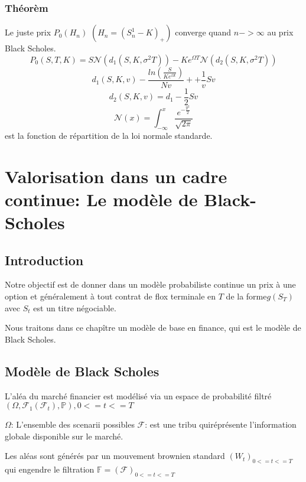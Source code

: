 \documentclass{article}
\begin{document}
\subsubsection{Th\'eor\`em}
Le juste prix $P_0(H_n)$ $(H_n=(S_n^1-K)_+)$ converge quand $n->\infty$ au prix Black Scholes.
\begin{equation}
P_0(S,T,K)=S\mathcal{N}(d_1(S,K,\sigma^2 T))-Ke^{\Omega T}\mathcal{N}(d_2(S,K,\sigma^2 T))
\end{equation}
\begin{equation}
d_1(S,K,v)-\frac{ln(\frac{S}{Ke^{\Omega t}})}{Nv}++\frac{1}{v}Sv
\end{equation}
\begin{equation}
d_2(S,K,v)=d_1-\frac{1}{2}Sv
\end{equation}
\begin{equation}
\mathcal{N}(x)=\int_{-\infty}^x\frac{e^{-\frac{y^2}{2}}}{\sqrt{2\pi}}
\end{equation}
est la fonction de r\'epartition de la loi normale standarde.

\section{Valorisation dans un cadre continue: Le mod\`ele de Black-Scholes}
\subsection{Introduction}
Notre objectif est de donner dans un mod\`ele probabiliste continue un prix \`a une option et g\'en\'eralement \`a tout contrat de flox terminale en $T$ de la forme$g(S_T)$ avec $S_t$ est un titre n\'egociable.

Nous traitons dans ce chap\^itre un mod\`ele de base en finance, qui est le mod\`ele de Black Scholes.

\subsection{Mod\`ele de Black Scholes}
L'al\'ea du march\'e financier est mod\'elis\'e via un espace de probabilit\'e filtr\'e $(\Omega,\mathcal{F}_1(\mathcal{F}_t),\mathbb{P}),0<=t<=T$

$\Omega$: L'ensemble des scenarii possibles
$\mathcal{F}$: est une tribu quir\'epr\'esente l'information globale disponible sur le march\'e.

Les al\'eas sont g\'en\'er\'es par un mouvement brownien standard $(W_t)_{0<=t<=T}$ qui engendre le filtration $\mathbb{F}=(\mathcal{F})_{0<=t<=T}$
\end{document}
